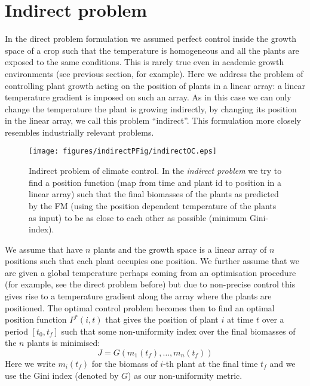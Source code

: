 \section{Indirect problem}
In the direct problem formulation we assumed perfect control inside the growth
space of a crop such that the temperature is homogeneous and all the plants are
exposed to the same conditions. This is rarely true even in academic growth
environments (see previous section, for example). Here we address the problem of
controlling plant growth acting on the position of plants in a linear array: a
linear temperature gradient is imposed on such an array. As in this case we can
only change the temperature the plant is growing indirectly, \ie by changing its
position in the linear array, we call this problem ``indirect''. This
formulation more closely resembles industrially relevant problems.


\begin{figure}
\centering
\texttt{[image: figures/indirectPFig/indirectOC.eps]}
\caption{Indirect problem of climate control. In the \emph{indirect problem} we
  try to find a position function (map from time and plant id to position in a
  linear array) such that the final biomasses of the plants as predicted by the
  FM (using the position dependent temperature of the plants as input) to be as
  close to each other as possible (minimum Gini-index).}
\label{fig:indirectP}
\end{figure}

We assume that have $n$ plants and the growth space is a linear array of $n$
positions such that each plant occupies one position. We further assume that we
are given a global temperature perhaps coming from an optimisation procedure
(for example, see the direct problem before) but due to non-precise control this
gives rise to a temperature gradient along the array where the plants are
positioned. The optimal control problem becomes then to find an optimal position
function $P^*(i, t)$ that gives the position of plant $i$ at time $t$ over a
period $[t_0, t_f]$ such that some non-uniformity index over the final biomasses
of the $n$ plants is minimised:
$$
J = G(m_1(t_f), \dots, m_n(t_f))
$$
Here we write $m_i(t_f)$ for the biomass of $i$-th plant at the final time $t_f$
and we use the Gini index (denoted by $G$) as our non-uniformity metric.

